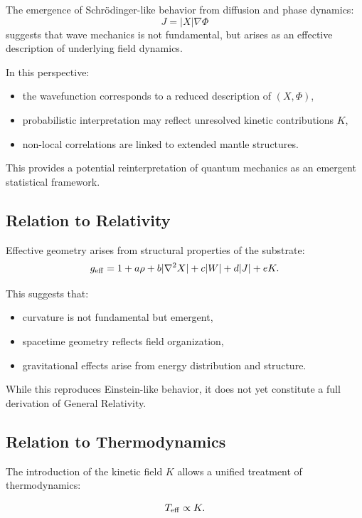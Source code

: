 \documentclass[11pt]{article}
\begin{document}
The emergence of Schrödinger-like behavior from diffusion and phase dynamics:
\begin{equation}
J = |X| \nabla \Phi
\end{equation}
suggests that wave mechanics is not fundamental, but arises as an effective description of underlying field dynamics.

In this perspective:
\begin{itemize}
\item the wavefunction corresponds to a reduced description of $(X, \Phi)$,
\item probabilistic interpretation may reflect unresolved kinetic contributions $K$,
\item non-local correlations are linked to extended mantle structures.
\end{itemize}

This provides a potential reinterpretation of quantum mechanics as an emergent statistical framework.

\subsection{Relation to Relativity}

Effective geometry arises from structural properties of the substrate:
\begin{equation}
g_{\rm eff} = 1 + a\rho + b|\nabla^2 X| + c|W| + d|J| + eK.
\end{equation}

This suggests that:
\begin{itemize}
\item curvature is not fundamental but emergent,
\item spacetime geometry reflects field organization,
\item gravitational effects arise from energy distribution and structure.
\end{itemize}

While this reproduces Einstein-like behavior, it does not yet constitute a full derivation of General Relativity.

\subsection{Relation to Thermodynamics}

The introduction of the kinetic field $K$ allows a unified treatment of thermodynamics:

\begin{equation}
T_{\rm eff} \propto K.
\end{equation}
\end{document}
